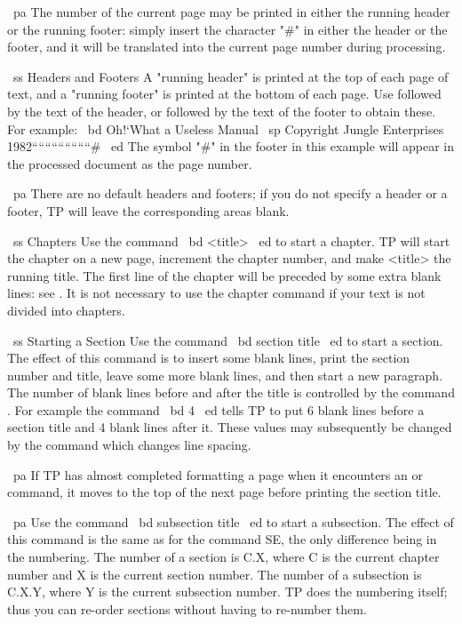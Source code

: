 ~pa The number of the current page may be printed in either the
running header or the running footer: simply insert the character
"#" in either the header or the footer, and it will be translated
into the current page number during processing.

~ss Headers and Footers
A "running header" is printed at the top of each page of text, and a
"running footer" is printed at the bottom of each page.
Use \TL followed by the text of the header, or \FL followed
by the text of the footer to obtain these.
For example:
~bd
\TL Oh!`What a Useless Manual
~sp
\FL Copyright Jungle Enterprises 1982``````````````````#
~ed
The symbol "#" in the footer in this example will appear in the
processed document as the page number.

~pa There are no default headers and footers; if you do not specify a header
or a footer, TP will leave the corresponding areas blank.

~ss Chapters
Use the command ~bd \CH <title> ~ed to start a chapter.
TP will start the chapter on a new page, increment the chapter number,
and make <title> the running title.
The first line of the chapter will be preceded by some extra blank lines:
see \VL.
It is not necessary to use the chapter command if your text is not
divided into chapters.

~ss Starting a Section
Use the command ~bd \SE section title ~ed to start a section.
The effect of this command is to insert some blank lines, print the
section number and title, leave some more blank lines, and then start
a new paragraph.
The number of blank lines before and after the title is controlled by
the command \SL.
For example the command
~bd  4 ~ed
tells TP to put 6 blank lines before a section title and 4 blank lines
after it.
These values may subsequently be changed by the command \LS which changes
line spacing.

~pa If TP has almost completed formatting a page when it encounters
an \SE or \SS command, it moves to the top of the next page before
printing the section title.

~pa Use the command ~bd \SS subsection title ~ed to start a subsection.
The effect of this command is the same as for the command SE,
the only difference being in the numbering.
The number of a section is C.X, where C is the current chapter number
and X is the current section number.
The number of a subsection is C.X.Y, where Y is the current subsection
number.
TP does the numbering itself; thus you can re-order sections without
having to re-number them.

